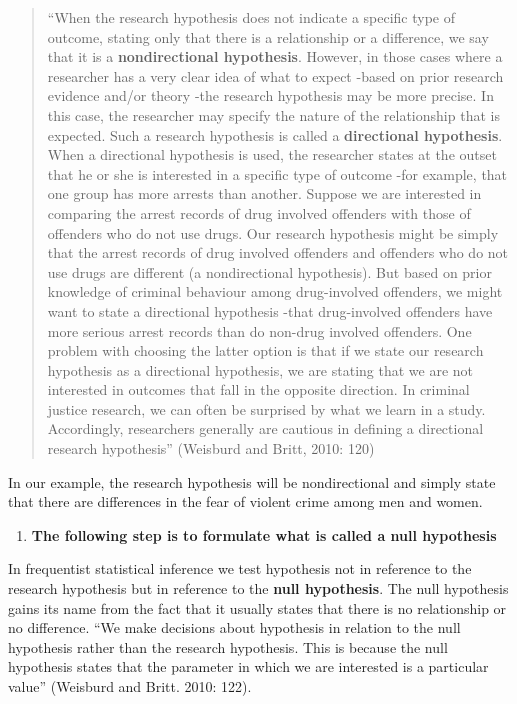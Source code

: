 \documentclass[
]{book}
\providecommand{\tightlist}{%
  \setlength{\itemsep}{0pt}\setlength{\parskip}{0pt}}
\begin{document}
\begin{quote}
``When the research hypothesis does not indicate a specific type of outcome, stating only that there is a relationship or a difference, we say that it is a \textbf{nondirectional hypothesis}. However, in those cases where a researcher has a very clear idea of what to expect -based on prior research evidence and/or theory -the research hypothesis may be more precise. In this case, the researcher may specify the nature of the relationship that is expected. Such a research hypothesis is called a \textbf{directional hypothesis}. When a directional hypothesis is used, the researcher states at the outset that he or she is interested in a specific type of outcome -for example, that one group has more arrests than another. Suppose we are interested in comparing the arrest records of drug involved offenders with those of offenders who do not use drugs. Our research hypothesis might be simply that the arrest records of drug involved offenders and offenders who do not use drugs are different (a nondirectional hypothesis). But based on prior knowledge of criminal behaviour among drug-involved offenders, we might want to state a directional hypothesis -that drug-involved offenders have more serious arrest records than do non-drug involved offenders. One problem with choosing the latter option is that if we state our research hypothesis as a directional hypothesis, we are stating that we are not interested in outcomes that fall in the opposite direction. In criminal justice research, we can often be surprised by what we learn in a study. Accordingly, researchers generally are cautious in defining a directional research hypothesis'' (Weisburd and Britt, 2010: 120)
\end{quote}

In our example, the research hypothesis will be nondirectional and simply state that there are differences in the fear of violent crime among men and women.

\begin{enumerate}
\def\labelenumi{\arabic{enumi}.}
\setcounter{enumi}{2}
\tightlist
\item
  \textbf{The following step is to formulate what is called a null hypothesis}
\end{enumerate}

In frequentist statistical inference we test hypothesis not in reference to the research hypothesis but in reference to the \textbf{null hypothesis}. The null hypothesis gains its name from the fact that it usually states that there is no relationship or no difference. ``We make decisions about hypothesis in relation to the null hypothesis rather than the research hypothesis. This is because the null hypothesis states that the parameter in which we are interested is a particular value'' (Weisburd and Britt. 2010: 122).
\end{document}
